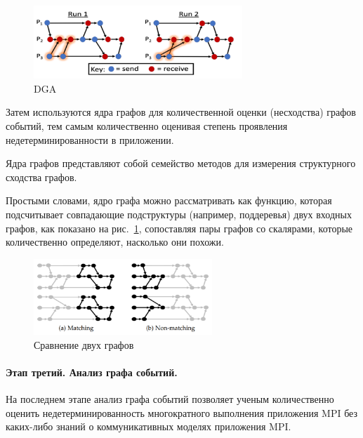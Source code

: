\begin{figure}[!ht]
	\centering
	\includegraphics[width=0.7\textwidth]{ResearchNotes/rndhpc_not_dbg_2021_11_10/dga.png}
	\caption{DGA} 
\end{figure}

Затем используются ядра графов для количественной оценки (несходства) графов событий, тем самым количественно оценивая степень проявления недетерминированности в приложении.

Ядра графов представляют собой семейство методов для измерения структурного сходства графов. 

Простыми словами, ядро графа можно рассматривать как функцию, которая подсчитывает совпадающие подструктуры (например, поддеревья) двух входных графов, как показано на рис.~\ref{lab.rndhpc2021.11.10.010}, сопоставляя пары графов со скалярами, которые количественно определяют, насколько они похожи.

\begin{figure}[!ht]
	\centering
	\includegraphics[width=0.6\textwidth]{ResearchNotes/rndhpc_not_dbg_2021_11_10/graph_comp.png}
	\caption{Сравнение двух графов}\label{lab.rndhpc2021.11.10.010}
\end{figure}

\paragraph{Этап третий. Анализ графа событий.} На последнем этапе анализ графа событий позволяет ученым количественно оценить недетерминированность многократного выполнения приложения MPI без каких-либо знаний о коммуникативных моделях приложения MPI.

\noteattributes{}

